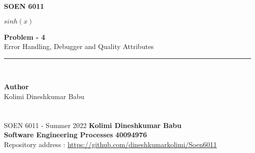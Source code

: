 \documentclass[letterpaper, 11pt]{report}
\begin{document}
\begin{titlepage}
\vspace*{0.7in}
\begin{center}
\begin{figure}[htb]
\begin{center}

\end{center}
\end{figure}
\vspace*{0.3in}
\begin{Large}
\textbf{SOEN 6011} \\
\end{Large}
\vspace*{0.1in}
\begin{Large}
\end{Large}
\vspace*{0.9in}
\begin{Large}
\textbf{$sinh(x)$} \\
\end{Large}
\vspace*{0.9in}
\begin{Large} 


\textbf{Problem - 4} \\
Error Handling, Debugger and Quality Attributes\\
\end{Large}
\vspace*{0.625in}
\rule{80mm}{0.1mm}\\
\vspace*{0.1in}
\begin{large}
\textbf{Author} \\
\vspace*{0.1in}
Kolimi Dineshkumar Babu
\vspace*{0.3in}
\date{\normalsize\today} 
\end{large}
\end{center}
\date{\normalsize\today} 
\end{titlepage}

\pagebreak

\section*{}
\normalsize {SOEN 6011 - Summer 2022} \hfill \textbf{Kolimi Dineshkumar Babu} \\
\textbf{ Software Engineering Processes}  \hfill \textbf{40094976} \\
\hfill Repository address : \url{https://github.com/dineshkumarkolimi/Soen6011}
\end{document}
